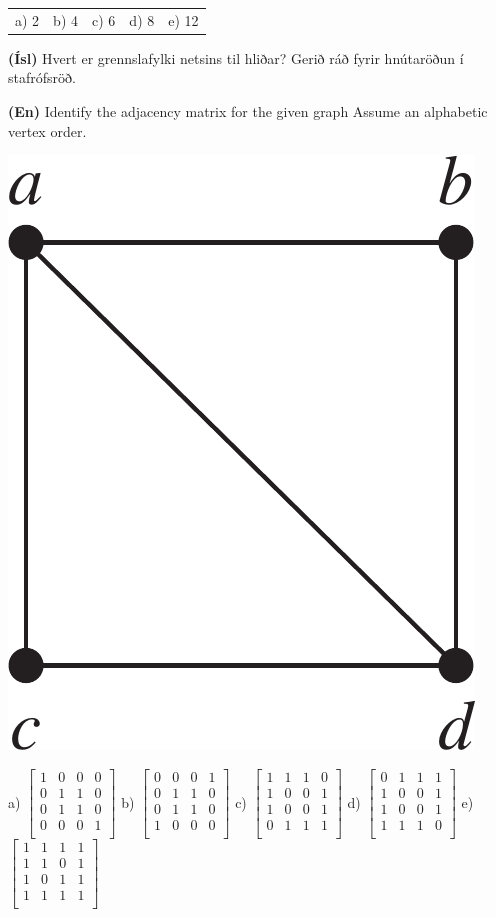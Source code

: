 \documentclass[addpoints]{exam}
\begin{document}
\begin{questions}
\begin{tabularx}{\textwidth}{XXXXX} %
    a) 2 & b) 4 & c) 6 & d) 8 & e) 12\\
\end{tabularx}

\question[3]

\begin{multicols}{2}
    \textbf{(Ísl)} Hvert er grennslafylki netsins til hliðar? Gerið ráð fyrir hnútaröðun í stafrófsröð.
    
    \textbf{(En)} Identify the adjacency matrix for the given graph Assume an alphabetic vertex order.

    \begin{center}
        \includegraphics[width=0.33\linewidth]{Pics/exam-graph-tiny}
    \end{center}
\end{multicols}
\begin{center}
a)
$
\begin{bmatrix}
    1&0&0&0\\
    0&1&1&0\\
    0&1&1&0\\
    0&0&0&1\\
\end{bmatrix}    
$
b)
$
\begin{bmatrix}
    0&0&0&1\\
    0&1&1&0\\
    0&1&1&0\\
    1&0&0&0\\
\end{bmatrix}    
$
c)
$
\begin{bmatrix}
    1&1&1&0\\
    1&0&0&1\\
    1&0&0&1\\
    0&1&1&1\\
\end{bmatrix}    
$
d) %
$
\begin{bmatrix}
    0&1&1&1\\
    1&0&0&1\\
    1&0&0&1\\
    1&1&1&0\\
\end{bmatrix}    
$
e) 
$
\begin{bmatrix}
    1&1&1&1\\
    1&1&0&1\\
    1&0&1&1\\
    1&1&1&1\\
\end{bmatrix}    
$
\end{center}


\end{questions}
\end{document}
